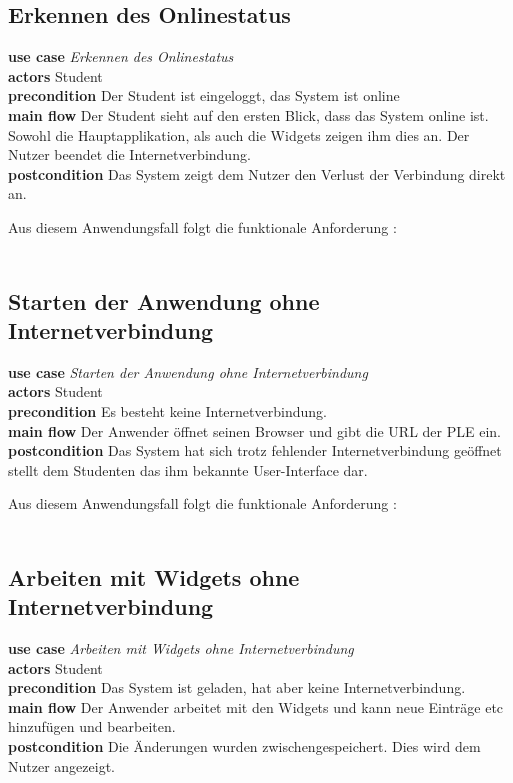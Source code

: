 \subsection{Erkennen des Onlinestatus}
\textbf{use case} \emph{Erkennen des Onlinestatus}\\
\textbf{actors} Student\\
\textbf{precondition} Der Student ist eingeloggt, das System ist online\\
\textbf{main flow} Der Student sieht auf den ersten Blick, dass das System online ist. Sowohl die Hauptapplikation, als auch die Widgets zeigen ihm dies an. Der Nutzer beendet die Internetverbindung.\\
\textbf{postcondition} Das System zeigt dem Nutzer den Verlust der Verbindung direkt an.
 
Aus diesem Anwendungsfall folgt die funktionale Anforderung :\\
\requirement{\requirementCheckOnlineStatus}\label{requirementCheckOnlineStatus}\\

\subsection{Starten der Anwendung ohne Internetverbindung}
\textbf{use case} \emph{Starten der Anwendung ohne Internetverbindung}\\
\textbf{actors} Student\\
\textbf{precondition} Es besteht keine Internetverbindung.\\
\textbf{main flow} Der Anwender öffnet seinen Browser und gibt die URL der PLE ein.\\
\textbf{postcondition} Das System hat sich trotz fehlender Internetverbindung geöffnet stellt dem Studenten das ihm bekannte User-Interface dar.
 
Aus diesem Anwendungsfall folgt die funktionale Anforderung :\\
\requirement{\requirementOfflineStart}\label{requirementOfflineStart}\\

\subsection{Arbeiten mit Widgets ohne Internetverbindung}
\textbf{use case} \emph{Arbeiten mit Widgets ohne Internetverbindung}\\
\textbf{actors} Student\\
\textbf{precondition} Das System ist geladen, hat aber keine Internetverbindung.\\
\textbf{main flow} Der Anwender arbeitet mit den Widgets und kann neue Einträge etc hinzufügen und bearbeiten.\\
\textbf{postcondition} Die Änderungen wurden zwischengespeichert. Dies wird dem Nutzer angezeigt.

